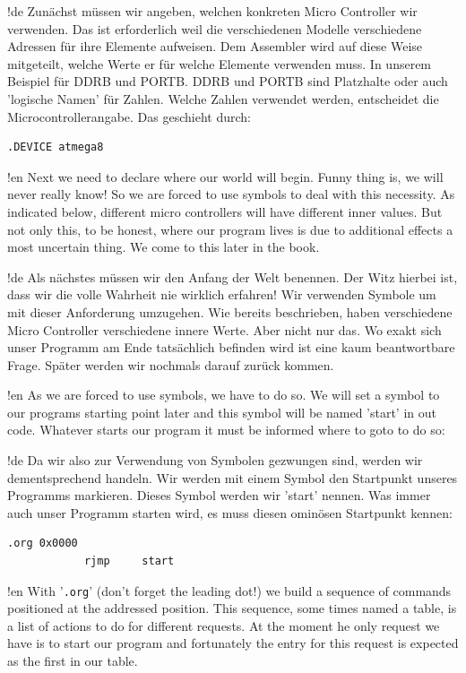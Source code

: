 !de Zunächst müssen wir angeben, welchen konkreten Micro Controller wir verwenden. Das ist erforderlich weil die verschiedenen Modelle verschiedene Adressen für ihre Elemente aufweisen. Dem Assembler wird auf diese Weise mitgeteilt, welche Werte er für welche Elemente verwenden muss. In unserem Beispiel für DDRB und PORTB. DDRB und PORTB sind Platzhalte oder auch 'logische Namen' für Zahlen. Welche Zahlen verwendet werden, entscheidet die Microcontrollerangabe. Das geschieht durch:

\begin{lstlisting}
.DEVICE atmega8
\end{lstlisting}



!en Next we need to declare where our world will begin. Funny thing is, we will never really know! So we are forced to use symbols to deal with this necessity. As indicated below, different micro controllers will have different inner values. But not only this, to be honest, where our program lives is due to additional effects a most uncertain thing. We come to this later in the book.

!de Als nächstes müssen wir den Anfang der Welt benennen. Der Witz hierbei ist, dass wir die volle Wahrheit nie wirklich erfahren! Wir verwenden Symbole um mit dieser Anforderung umzugehen. Wie bereits beschrieben, haben verschiedene Micro Controller verschiedene innere Werte. Aber nicht nur das. Wo exakt sich unser Programm am Ende tatsächlich befinden wird ist eine kaum beantwortbare Frage. Später werden wir nochmals darauf zurück kommen.


!en As we are forced to use symbols, we have to do so. We will set a symbol to our programs starting point later and this symbol will be named 'start' in out code. Whatever starts our program it must be informed where to goto to do so:

!de Da wir also zur Verwendung von Symbolen gezwungen sind, werden wir dementsprechend handeln. Wir werden mit einem Symbol den Startpunkt unseres Programms markieren. Dieses Symbol werden wir 'start' nennen. Was immer auch unser Programm starten wird, es muss diesen ominösen Startpunkt kennen:

\begin{lstlisting}
.org 0x0000
            rjmp     start 
\end{lstlisting}



!en With '\texttt{.org}' (don't forget the leading dot!) we build a sequence of commands positioned at the addressed position. This sequence, some times named a table, is a list of actions to do for different requests. At the moment he only request we have is to start our program and fortunately the entry for this request is expected as the first in our table.

